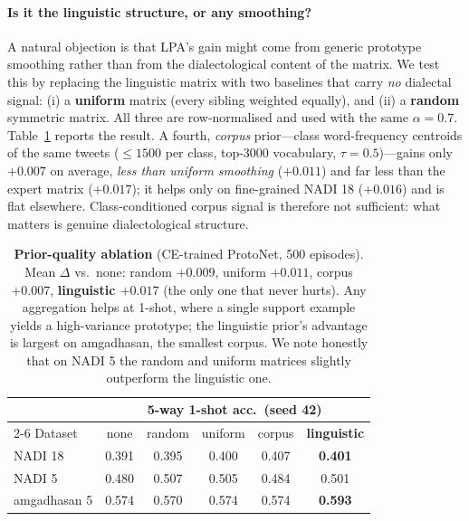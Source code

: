 \documentclass[11pt]{article}
\begin{document}
\paragraph{Is it the linguistic structure, or any smoothing?}
A natural objection is that LPA's gain might come from generic
prototype smoothing rather than from the dialectological
content of the matrix. We test this by replacing the linguistic
matrix with two baselines that carry \emph{no} dialectal
signal: (i) a \textbf{uniform} matrix (every sibling weighted
equally), and (ii) a \textbf{random} symmetric matrix. All
three are row-normalised and used with the same $\alpha{=}0.7$.
Table~\ref{tab:prior} reports the result.
 A fourth, \emph{corpus} prior---class word-frequency centroids
 of the same tweets (${\le}1500$ per class, top-$3000$ vocabulary,
 $\tau{=}0.5$)---gains only $+0.007$ on average, \emph{less than
 uniform smoothing} ($+0.011$) and far less than the expert matrix
 ($+0.017$); it helps only on fine-grained NADI 18 ($+0.016$)
 and is flat elsewhere. Class-conditioned corpus signal is
 therefore not sufficient: what matters is genuine
 dialectological structure.

\begin{table}[t]
\centering\scriptsize
{\setlength{\tabcolsep}{3pt}
\begin{tabular}{lccccc}
\toprule
& \multicolumn{5}{c}{5-way 1-shot acc.\ (seed 42)} \\
\cmidrule(lr){2-6}
Dataset & none & random & uniform & corpus & \textbf{linguistic} \\
\midrule
NADI 18        & 0.391 & 0.395 & 0.400 & 0.407 & \textbf{0.401} \\
NADI 5         & 0.480 & 0.507 & 0.505 & 0.484 & 0.501 \\
amgadhasan 5   & 0.574 & 0.570 & 0.574 & 0.574 & \textbf{0.593} \\
\bottomrule
\end{tabular}}
\caption{\textbf{Prior-quality ablation} (CE-trained ProtoNet,
500 episodes).\\Mean $\Delta$ vs.\ none: random $+0.009$, uniform $+0.011$, corpus $+0.007$,
\textbf{linguistic $+0.017$} (the only one that never hurts).
Any aggregation helps at 1-shot, where a single support example
yields a high-variance prototype; the linguistic prior's
advantage is largest on amgadhasan, the smallest corpus. We
note honestly that on NADI 5 the random and uniform matrices
slightly outperform the linguistic one.}
\label{tab:prior}
\end{table}
\end{document}
